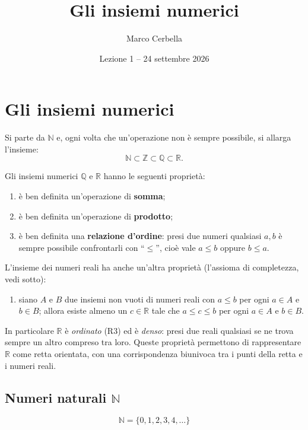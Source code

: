 \documentclass[11pt,a4paper]{article}
\title{Gli insiemi numerici}
\author{Marco Cerbella}
\date{Lezione 1 -- 24 settembre 2026}
\theoremstyle{definition}
\begin{document}
\maketitle

\section{Gli insiemi numerici}

Si parte da $\mathbb{N}$ e, ogni volta che un'operazione non è sempre
possibile, si allarga l'insieme:
\[
\mathbb{N} \subset \mathbb{Z} \subset \mathbb{Q} \subset \mathbb{R}.
\]

Gli insiemi numerici $\mathbb{Q}$ e $\mathbb{R}$ hanno le seguenti proprietà:
\begin{enumerate}
    \item[(R1)] è ben definita un'operazione di \textbf{somma};
    \item[(R2)] è ben definita un'operazione di \textbf{prodotto};
    \item[(R3)] è ben definita una \textbf{relazione d'ordine}: presi due numeri qualsiasi $a, b$ è sempre possibile confrontarli con ``$\leq$'', cioè vale $a \leq b$ oppure $b \leq a$.
\end{enumerate}
L'insieme dei numeri reali ha anche un'altra proprietà (l'assioma di completezza, vedi sotto):
\begin{enumerate}
    \item[(R4)] siano $A$ e $B$ due insiemi non vuoti di numeri reali con $a \leq b$ per ogni $a \in A$ e $b \in B$; allora esiste almeno un $c \in \mathbb{R}$ tale che $a \leq c \leq b$ per ogni $a \in A$ e $b \in B$.
\end{enumerate}
In particolare $\mathbb{R}$ è \emph{ordinato} (R3) ed è \emph{denso}: presi due reali qualsiasi se ne trova sempre un altro compreso tra loro. Queste proprietà permettono di rappresentare $\mathbb{R}$ come retta orientata, con una corrispondenza biunivoca tra i punti della retta e i numeri reali.

\newpage
\subsection{Numeri naturali $\mathbb{N}$}

\[
\mathbb{N} = \{0, 1, 2, 3, 4, \dots\}
\]
\end{document}
